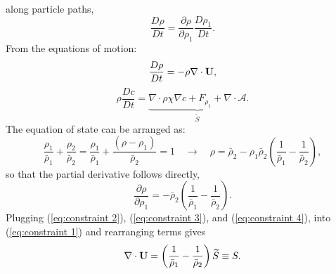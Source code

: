 \documentclass[final]{siamltex}
\def\Ub {{\bf U}}
\def\bA {\bm{\mathcal{A}}}
\begin{document}
along particle paths,
\begin{equation}
\frac{D\rho}{Dt} = \frac{\partial\rho}{\partial\rho_1}\frac{D\rho_1}{Dt}.\label{eq:constraint 1}
\end{equation}
From the equations of motion:
\begin{equation}
\frac{D\rho}{Dt} = -\rho\nabla\cdot\Ub,\label{eq:constraint 2}
\end{equation}
\begin{equation}
\rho\frac{Dc}{Dt} = \underbrace{\nabla\cdot\rho\chi\nabla c + F_{\rho_1} + \nabla\cdot\bA}_{\widetilde S}.\label{eq:constraint 3}
\end{equation}
The equation of state can be arranged as:
\begin{equation}
\frac{\rho_1}{\bar\rho_1} + \frac{\rho_2}{\bar\rho_2} =
\frac{\rho_1}{\bar\rho_1} + \frac{(\rho-\rho_1)}{\bar\rho_2} = 1
\quad \rightarrow \quad
\rho = \bar\rho_2 - \rho_1\bar\rho_2\left(\frac{1}{\bar\rho_1} - \frac{1}{\bar\rho_2}\right),
\end{equation}
so that the partial derivative follows directly,
\begin{equation}
\frac{\partial\rho}{\partial\rho_1} = -\bar\rho_2\left(\frac{1}{\bar\rho_1} - \frac{1}{\bar\rho_2}\right).\label{eq:constraint 4}
\end{equation}
Plugging (\ref{eq:constraint 2}), (\ref{eq:constraint 3}), and (\ref{eq:constraint 4}), into (\ref{eq:constraint 1}) and
rearranging terms gives
\begin{equation}
\nabla\cdot\Ub = \left(\frac{1}{\bar\rho_1}-\frac{1}{\bar\rho_2}\right)\widetilde S \equiv S.
\end{equation}

\end{document}
